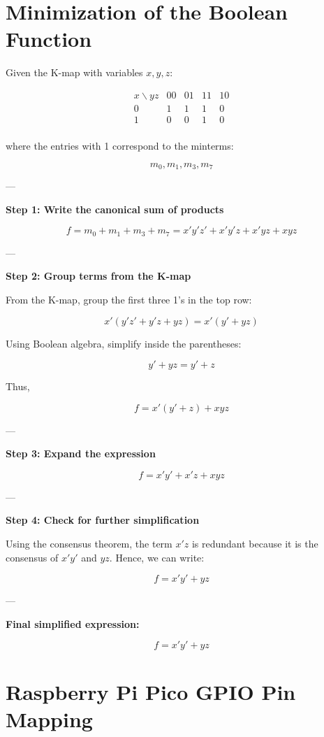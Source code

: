 \documentclass{article}
\begin{document}
\large  %

\section*{Minimization of the Boolean Function}

Given the K-map with variables \(x, y, z\):

\[
\begin{array}{c|cccc}
x \backslash yz & 00 & 01 & 11 & 10 \\ \hline
0 & 1 & 1 & 1 & 0 \\
1 & 0 & 0 & 1 & 0 \\
\end{array}
\]

where the entries with 1 correspond to the minterms:

\[
m_0, m_1, m_3, m_7
\]

---

\textbf{Step 1: Write the canonical sum of products}

\[
f = m_0 + m_1 + m_3 + m_7 = x'y'z' + x'y'z + x'yz + xyz
\]

---

\textbf{Step 2: Group terms from the K-map}

From the K-map, group the first three 1's in the top row:

\[
x'(y'z' + y'z + yz) = x' (y' + y z)
\]

Using Boolean algebra, simplify inside the parentheses:

\[
y' + y z = y' + z
\]

Thus,

\[
f = x'(y' + z) + x y z
\]

---

\textbf{Step 3: Expand the expression}

\[
f = x'y' + x'z + xyz
\]

---

\textbf{Step 4: Check for further simplification}

Using the consensus theorem, the term \(x'z\) is redundant because it is the consensus of \(x'y'\) and \(yz\). Hence, we can write:

\[
f = x'y' + y z
\]

---

\textbf{Final simplified expression:}

\[
\boxed{
f = x'y' + y z
}
\]

\bigskip

\section*{Raspberry Pi Pico GPIO Pin Mapping}
\end{document}
